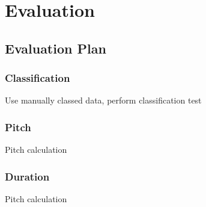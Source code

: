 \chapter{Evaluation}

\section{Evaluation Plan}


\subsection{Classification}

Use manually classed data, perform classification test

\subsection{Pitch}
Pitch calculation

\subsection{Duration}
Pitch calculation

